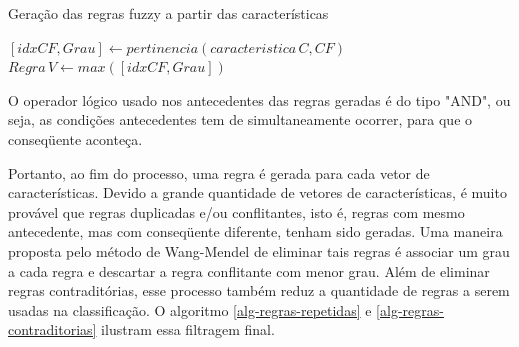 \documentclass[template.tex]{subfiles}
\begin{document}
\begin{algorithm}
\begin{algorithmic}[1]
\caption{Geração das regras fuzzy a partir das características}
\label{alg-graus}
      \STATE $[idxCF,Grau] \leftarrow pertinencia(caracteristica\,C,CF)$
      \ENDFOR
   \STATE $Regra \, V \leftarrow max([idxCF,Grau]) $
   \ENDFOR
\ENDFOR
\end{algorithmic}
\end{algorithm}




O operador lógico usado nos antecedentes das regras geradas é do tipo "AND", ou seja, as condições antecedentes tem de simultaneamente ocorrer, para que o conseqüente aconteça.

Portanto, ao fim do processo, uma regra é gerada para cada vetor de características. Devido a grande quantidade de vetores de características, é muito provável que regras duplicadas e/ou conflitantes, isto é, regras com mesmo antecedente, mas com conseqüente diferente, tenham sido geradas. Uma maneira proposta pelo método de Wang-Mendel de eliminar tais regras é associar um grau a cada regra e descartar a regra conflitante com menor grau. Além de eliminar regras contraditórias, esse processo também reduz a quantidade de regras a serem usadas na classificação. O algoritmo \ref{alg-regras-repetidas} e \ref{alg-regras-contraditorias} ilustram essa filtragem final.
\end{document}
